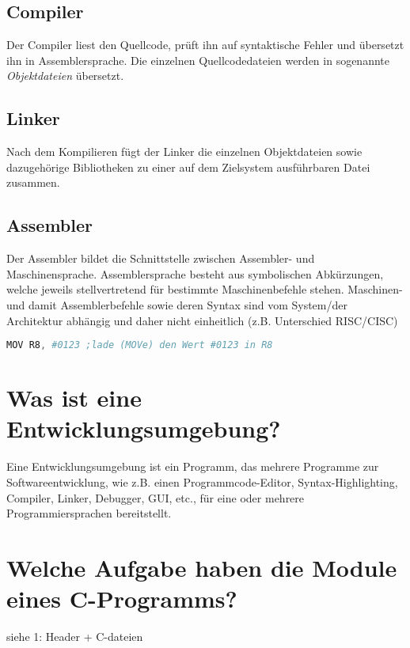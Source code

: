 \documentclass[a4paper, 12pt]{article}
\begin{document}
  \subsection{Compiler}
  Der Compiler liest den Quellcode, prüft ihn auf syntaktische Fehler und
  übersetzt ihn in Assemblersprache. Die einzelnen
  Quellcodedateien werden in sogenannte \emph{Objektdateien} übersetzt.

  \subsection{Linker}
  Nach dem Kompilieren fügt der Linker die einzelnen Objektdateien sowie
  dazugehörige Bibliotheken zu einer auf
  dem Zielsystem ausführbaren Datei zusammen.

  \subsection{Assembler}
  Der Assembler bildet die Schnittstelle zwischen Assembler- und
  Maschinensprache. Assemblersprache besteht aus symbolischen Abkürzungen,
  welche jeweils stellvertretend für bestimmte Maschinenbefehle stehen.
  Maschinen- und damit Assemblerbefehle sowie deren Syntax sind vom System/der Architektur abhängig und daher nicht
  einheitlich (z.B. Unterschied RISC/CISC)

\vspace{\parskip}
\begin{lstlisting}[language=Assembler]
 MOV R8, #0123 ;lade (MOVe) den Wert #0123 in R8
\end{lstlisting}

  \section{Was ist eine Entwicklungsumgebung?}
  Eine Entwicklungsumgebung ist ein Programm, das mehrere Programme zur
  Softwareentwicklung, wie z.B. einen Programmcode-Editor, Syntax-Highlighting,
  Compiler, Linker, Debugger, GUI, etc., für eine oder mehrere Programmiersprachen bereitstellt.

  \section{Welche Aufgabe haben die Module eines C-Programms?}
  siehe 1: Header + C-dateien
  
\end{document}
